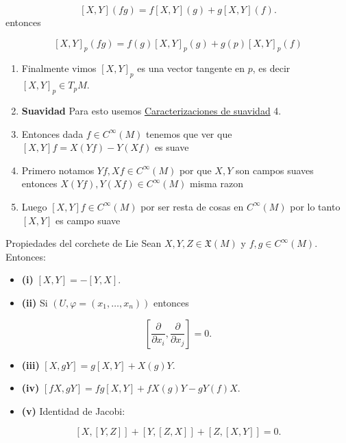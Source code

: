 \begin{bookproof}{}
\[
[X,Y](fg)=f[X,Y](g)+g[X,Y](f).
\]
entonces

\[
[X,Y]_{p}(fg)=f(g)[X,Y]_{p}(g)+g(p)[X,Y]_{p}(f)
\]
\begin{enumerate}[start=11]
\item Finalmente vimos $[X,Y]_p$ es una vector tangente en $p$, es decir $[X,Y]_p\in T_pM$.
\item \textbf{Suavidad} Para esto usemos \hyperref[blk:3accf8]{Caracterizaciones de suavidad} 4.
\item Entonces dada $f\in C^{\infty}(M)$ tenemos que ver que $[X,Y]f=X(Yf)-Y(Xf)$ es suave
\item Primero notamos $Yf,Xf\in C^{\infty}(M)$ por que $X,Y$ son campos suaves entonces $X(Yf),Y(Xf)\in C^{\infty}(M)$ misma razon
\item Luego $[X,Y]f\in C^{\infty}(M)$ por ser resta de cosas en $C^{\infty}(M)$ por lo tanto $[X,Y]$ es campo suave
\end{enumerate}
\bookqed
\end{bookproof}
\begin{bookproposition}{Propiedades del corchete de Lie}
Sean $X,Y,Z\in\mathfrak X(M)$ y $f,g\in C^\infty(M)$. Entonces:

\begin{itemize}
\item \textbf{(i)} $[X,Y]=-[Y,X]$.
\item \textbf{(ii)} Si $(U,\varphi=(x_{1},\ldots,x_{n}))$ entonces
\end{itemize}
\[
\left[\frac{\partial}{\partial x_i},\frac{\partial}{\partial x_j}\right]=0.
\]
\begin{itemize}
\item \textbf{(iii)} $[X,gY]=g[X,Y]+X(g)Y$.
\item \textbf{(iv)} $[fX,gY]=fg[X,Y]+fX(g)Y-gY(f)X$.
\item \textbf{(v)} Identidad de Jacobi:
\end{itemize}
\[
[X,[Y,Z]]+[Y,[Z,X]]+[Z,[X,Y]]=0.
\]
\end{bookproposition}
